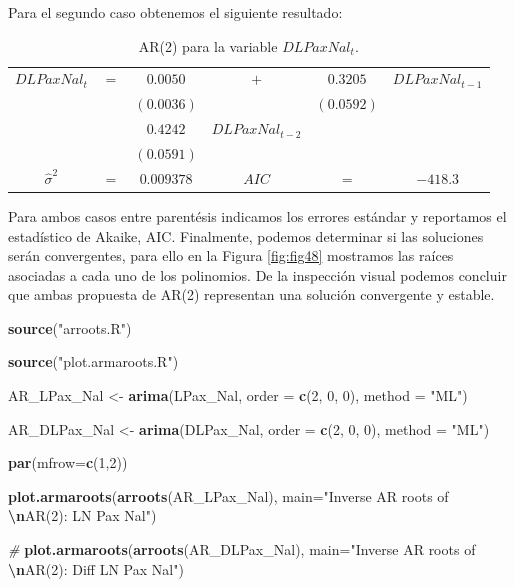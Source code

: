 \documentclass[
]{book}
\newenvironment{Shaded}{\begin{snugshade}}{\end{snugshade}}
\newcommand{\AttributeTok}[1]{\textcolor[rgb]{0.13,0.29,0.53}{#1}}
\newcommand{\CommentTok}[1]{\textcolor[rgb]{0.56,0.35,0.01}{\textit{#1}}}
\newcommand{\DecValTok}[1]{\textcolor[rgb]{0.00,0.00,0.81}{#1}}
\newcommand{\FunctionTok}[1]{\textcolor[rgb]{0.13,0.29,0.53}{\textbf{#1}}}
\newcommand{\NormalTok}[1]{#1}
\newcommand{\OtherTok}[1]{\textcolor[rgb]{0.56,0.35,0.01}{#1}}
\newcommand{\SpecialCharTok}[1]{\textcolor[rgb]{0.81,0.36,0.00}{\textbf{#1}}}
\newcommand{\StringTok}[1]{\textcolor[rgb]{0.31,0.60,0.02}{#1}}
\begin{document}
Para el segundo caso obtenemos el siguiente resultado:

\begin{longtable}[]{@{}cccccc@{}}
\caption{\label{tab:AR0201} AR(2) para la variable \(DLPaxNal_t\).}\tabularnewline
\toprule\noalign{}
\endfirsthead
\endhead
\bottomrule\noalign{}
\endlastfoot
\(DLPaxNal_t\) & \(=\) & \(0.0050\) & \(+\) & \(0.3205\) & \(DLPaxNal_{t-1}\) \\
& & \((0.0036)\) & & \((0.0592)\) & \\
& & \(0.4242\) & \(DLPaxNal_{t-2}\) & & \\
& & \((0.0591)\) & & & \\
\(\hat{\sigma}^2\) & \(=\) & \(0.009378\) & \(AIC\) & \(=\) & \(-418.3\) \\
\end{longtable}

Para ambos casos entre parentésis indicamos los errores estándar y reportamos el estadístico de Akaike, AIC. Finalmente, podemos determinar si las soluciones serán convergentes, para ello en la Figura \ref{fig:fig48} mostramos las raíces asociadas a cada uno de los polinomios. De la inspección visual podemos concluir que ambas propuesta de AR(2) representan una solución convergente y estable.

\begin{Shaded}
\begin{Highlighting}[]
\FunctionTok{source}\NormalTok{(}\StringTok{"arroots.R"}\NormalTok{)}

\FunctionTok{source}\NormalTok{(}\StringTok{"plot.armaroots.R"}\NormalTok{)}

\NormalTok{AR\_LPax\_Nal }\OtherTok{\textless{}{-}} \FunctionTok{arima}\NormalTok{(LPax\_Nal, }\AttributeTok{order =} \FunctionTok{c}\NormalTok{(}\DecValTok{2}\NormalTok{, }\DecValTok{0}\NormalTok{, }\DecValTok{0}\NormalTok{), }
                     \AttributeTok{method =} \StringTok{"ML"}\NormalTok{)}

\NormalTok{AR\_DLPax\_Nal }\OtherTok{\textless{}{-}} \FunctionTok{arima}\NormalTok{(DLPax\_Nal, }\AttributeTok{order =} \FunctionTok{c}\NormalTok{(}\DecValTok{2}\NormalTok{, }\DecValTok{0}\NormalTok{, }\DecValTok{0}\NormalTok{), }
                      \AttributeTok{method =} \StringTok{"ML"}\NormalTok{)}

\FunctionTok{par}\NormalTok{(}\AttributeTok{mfrow=}\FunctionTok{c}\NormalTok{(}\DecValTok{1}\NormalTok{,}\DecValTok{2}\NormalTok{))}

\FunctionTok{plot.armaroots}\NormalTok{(}\FunctionTok{arroots}\NormalTok{(AR\_LPax\_Nal), }
               \AttributeTok{main=}\StringTok{"Inverse AR roots of }\SpecialCharTok{\textbackslash{}n}\StringTok{AR(2): LN Pax Nal"}\NormalTok{)}

\CommentTok{\#}
\FunctionTok{plot.armaroots}\NormalTok{(}\FunctionTok{arroots}\NormalTok{(AR\_DLPax\_Nal), }
               \AttributeTok{main=}\StringTok{"Inverse AR roots of }\SpecialCharTok{\textbackslash{}n}\StringTok{AR(2): Diff LN Pax Nal"}\NormalTok{)}
\end{Highlighting}
\end{Shaded}
\end{document}
